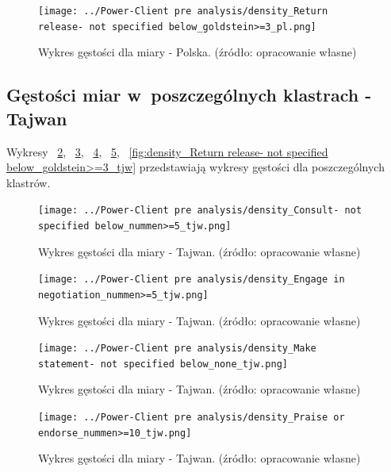 \documentclass[11pt]{report}
\begin{document}
    \begin{figure}[tp]
        \centering
        \texttt{[image: ../Power-Client pre analysis/density\_Return release- not specified below\_goldstein>=3\_pl.png]}
        \caption{Wykres gęstości dla miary - Polska. (źródło: opracowanie własne)}
        \label{fig:density_Return release- not specified below_goldstein>=3_pl}
    \end{figure}

    \subsection{Gęstości miar w~poszczególnych klastrach - Tajwan}\label{subsec:gęstośc-miar-w-poszczególnych-klastrach---tajwan}

    Wykresy
    ~\ref{fig:density_Consult- not specified below_nummen>=5_tjw},
    ~\ref{fig:density_Engage in negotiation_nummen>=5_tjw},
    ~\ref{fig:density_Make statement- not specified below_none_tjw},
    ~\ref{fig:density_Praise or endorse_nummen>=10_tjw},
    ~\ref{fig:density_Return release- not specified below_goldstein>=3_tjw}
    przedstawiają wykresy gęstości dla poszczególnych klastrów.

    \begin{figure}[tp]
        \centering
        \texttt{[image: ../Power-Client pre analysis/density\_Consult- not specified below\_nummen>=5\_tjw.png]}
        \caption{Wykres gęstości dla miary - Tajwan. (źródło: opracowanie własne)}
        \label{fig:density_Consult- not specified below_nummen>=5_tjw}
    \end{figure}

    \begin{figure}[tp]
        \centering
        \texttt{[image: ../Power-Client pre analysis/density\_Engage in negotiation\_nummen>=5\_tjw.png]}
        \caption{Wykres gęstości dla miary - Tajwan. (źródło: opracowanie własne)}
        \label{fig:density_Engage in negotiation_nummen>=5_tjw}
    \end{figure}

    \begin{figure}[tp]
        \centering
        \texttt{[image: ../Power-Client pre analysis/density\_Make statement- not specified below\_none\_tjw.png]}
        \caption{Wykres gęstości dla miary - Tajwan. (źródło: opracowanie własne)}
        \label{fig:density_Make statement- not specified below_none_tjw}
    \end{figure}

    \begin{figure}[tp]
        \centering
        \texttt{[image: ../Power-Client pre analysis/density\_Praise or endorse\_nummen>=10\_tjw.png]}
        \caption{Wykres gęstości dla miary - Tajwan. (źródło: opracowanie własne)}
        \label{fig:density_Praise or endorse_nummen>=10_tjw}
    \end{figure}
\end{document}
